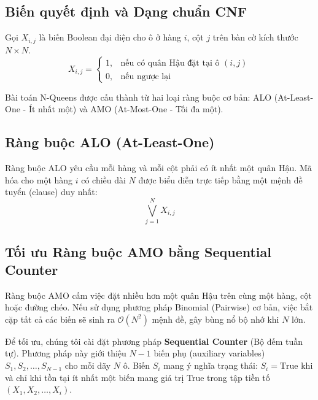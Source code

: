 \documentclass[a4paper,fleqn]{cas-sc}
\begin{document}
    \subsection{Biến quyết định và Dạng chuẩn CNF}\label{subsec:variables}
    Gọi $X_{i,j}$ là biến Boolean đại diện cho ô ở hàng $i$, cột $j$ trên bàn cờ kích thước $N \times N$.
    \begin{equation}\label{eq:var_def}
        X_{i,j} =
        \begin{cases}
            1, & \text{nếu có quân Hậu đặt tại ô } (i,j) \\
            0, & \text{nếu ngược lại}
        \end{cases}
    \end{equation}

    Bài toán N-Queens được cấu thành từ hai loại ràng buộc cơ bản: ALO (At-Least-One - Ít nhất một) và AMO (At-Most-One
    - Tối đa một).

    \subsection{Ràng buộc ALO (At-Least-One)}\label{subsec:alo}
    Ràng buộc ALO yêu cầu mỗi hàng và mỗi cột phải có ít nhất một quân Hậu.
    Mã hóa cho một hàng $i$ có chiều dài $N$ được biểu diễn trực tiếp bằng một mệnh đề tuyển (clause) duy nhất:
    \begin{equation}\label{eq:alo_row}
        \bigvee_{j=1}^{N} X_{i,j}
    \end{equation}

    \subsection{Tối ưu Ràng buộc AMO bằng Sequential Counter}\label{subsec:amo_seq}
    Ràng buộc AMO cấm việc đặt nhiều hơn một quân Hậu trên cùng một hàng, cột hoặc đường chéo.
    Nếu sử dụng phương pháp Binomial (Pairwise) cơ bản, việc bắt cặp tất cả các biến sẽ sinh ra $\mathcal{O}(N^2)$
    mệnh đề, gây bùng nổ bộ nhớ khi $N$ lớn.

    Để tối ưu, chúng tôi cài đặt phương pháp \textbf{Sequential Counter} (Bộ đếm tuần tự).
    Phương pháp này giới thiệu $N-1$ biến phụ (auxiliary variables) $S_1, S_2, \dots, S_{N-1}$ cho mỗi dãy $N$ ô.
    Biến $S_i$ mang ý nghĩa trạng thái: $S_i = \text{True}$
    khi và chỉ khi tồn tại ít nhất một biến mang giá trị True trong tập tiền tố $(X_1, X_2, \dots, X_i)$.
\end{document}
